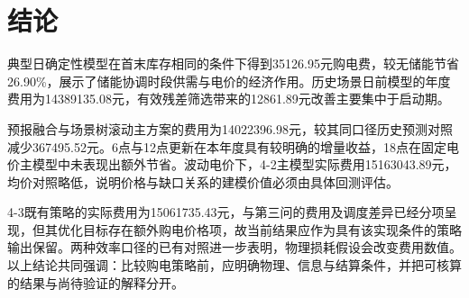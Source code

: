 \section{结论}
典型日确定性模型在首末库存相同的条件下得到35126.95元购电费，较无储能节省26.90\%，展示了储能协调时段供需与电价的经济作用。历史场景日前模型的年度费用为14389135.08元，有效残差筛选带来的12861.89元改善主要集中于启动期。

预报融合与场景树滚动主方案的费用为14022396.98元，较其同口径历史预测对照减少367495.52元。6点与12点更新在本年度具有较明确的增量收益，18点在固定电价主模型中未表现出额外节省。波动电价下，4-2主模型实际费用15163043.89元，均价对照略低，说明价格与缺口关系的建模价值必须由具体回测评估。

4-3既有策略的实际费用为15061735.43元，与第三问的费用及调度差异已经分项呈现，但其优化目标存在额外购电价格项，故当前结果应作为具有该实现条件的策略输出保留。两种效率口径的已有对照进一步表明，物理损耗假设会改变费用数值。以上结论共同强调：比较购电策略前，应明确物理、信息与结算条件，并把可核算的结果与尚待验证的解释分开。
